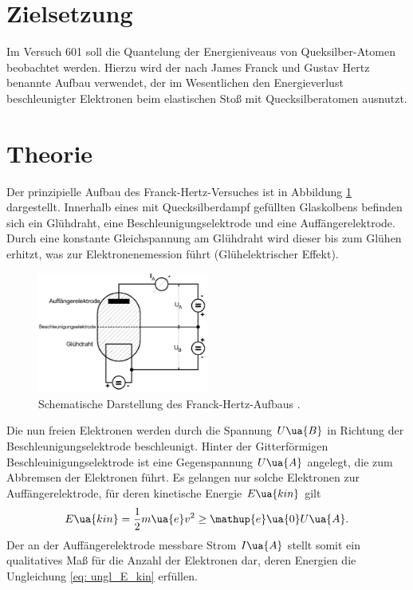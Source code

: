 \setcounter{page}{1}
\section*{Zielsetzung}
Im Versuch 601 soll die Quantelung der Energieniveaus von Queksilber-Atomen beobachtet werden.
Hierzu wird der nach James Franck und Gustav Hertz benannte Aufbau verwendet, der im Wesentlichen
den Energieverlust beschleunigter Elektronen beim elastischen Stoß mit Quecksilberatomen ausnutzt.

\section{Theorie}
Der prinzipielle Aufbau des Franck-Hertz-Versuches ist in Abbildung \ref{fig: schema_aufbau} dargestellt. Innerhalb
eines mit Quecksilberdampf gefüllten Glaskolbens befinden sich ein Glühdraht, eine Beschleunigungselektrode und
eine Auffängerelektrode. Durch eine konstante Gleichspannung am Glühdraht wird dieser bis zum Glühen
erhitzt, was zur Elektronenemession führt (Glühelektrischer Effekt).
\begin{figure}
  \centering
  \includegraphics[width = 0.5\textwidth]{pics/schema_aufbau.png}
  \caption{Schematische Darstellung des Franck-Hertz-Aufbaus \cite{anleitung601}.}
  \label{fig: schema_aufbau}
\end{figure}
Die nun freien Elektronen werden durch die Spannung $U\ua{B}$ in Richtung der Beschleunigungselektrode
beschleunigt. Hinter der Gitterförmigen Beschleuinigungselektrode ist eine Gegenspannung $U\ua{A}$ angelegt, die zum Abbremsen %
der Elektronen führt. Es gelangen nur solche Elektronen zur Auffängerelektrode, für deren kinetische Energie $E\ua{kin}$
gilt
\begin{equation}
 \label{eq: ungl_E_kin}
  E\ua{kin} = \frac{1}{2}m\ua{e}v^2 \geq \mathup{e}\ua{0}U\ua{A}.
\end{equation}
Der an der Auffängerelektrode messbare Strom $I\ua{A}$ stellt somit ein qualitatives Maß für die Anzahl der
Elektronen dar, deren Energien die Ungleichung \eqref{eq: ungl_E_kin} erfüllen.\\
